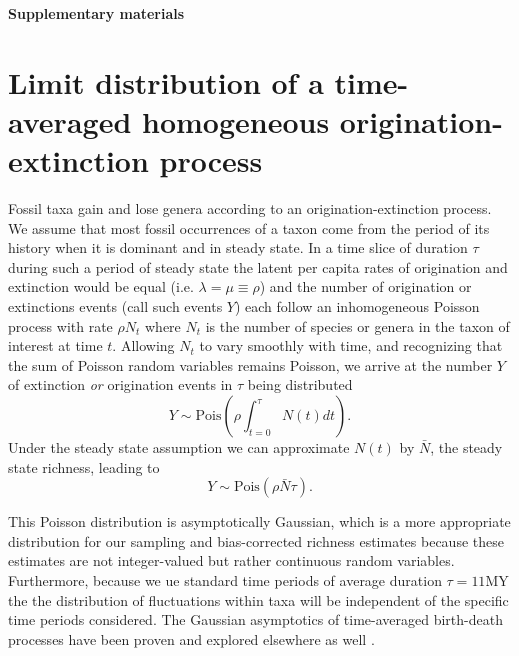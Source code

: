 \documentclass[12pt]{article}
\let\citep=\cite
\begin{document}
\clearpage

\newcommand{\beginsupplement}{%
  \setcounter{table}{0}
  \renewcommand{\thetable}{S\arabic{table}}%
  \setcounter{figure}{0}
  \renewcommand{\thefigure}{S\arabic{figure}}%
  \setcounter{section}{0}
  \renewcommand{\thesection}{S\arabic{section}}%
}

\beginsupplement

\begin{center}
{\LARGE \bf Supplementary materials}
\end{center}
\vspace{2em}

\section{Limit distribution of a time-averaged homogeneous
  origination-extinction process}
\label{sec:suppLimitDist}

Fossil taxa gain and lose genera according to an origination-extinction
process. We assume that most fossil occurrences of a taxon come from
the period of its history when it is dominant and in steady state. In
a time slice of duration $\tau$ during such a period of steady state
the latent per capita rates of origination and extinction would be
equal (i.e. $\lambda = \mu \equiv \rho$) and the number of origination
or extinctions events (call such events $Y$) each follow an
inhomogeneous Poisson process with rate $\rho N_t$ where $N_t$ is the
number of species or genera in the taxon of interest at time
$t$. Allowing $N_t$ to vary smoothly with time, and recognizing that
the sum of Poisson random variables remains Poisson, we arrive at the
number $Y$ of extinction \emph{or} origination events in $\tau$ being
distributed
\begin{equation}
  \label{eq:eventPois1}
  Y \sim \text{Pois}(\rho \int_{t=0}^\tau N(t) dt).
\end{equation}
Under the steady state assumption we can approximate $N(t)$ by
$\bar{N}$, the steady state richness, leading to
\begin{equation}
  \label{eq:eventPois2}
  Y \sim \text{Pois}(\rho \bar{N} \tau).
\end{equation}

This Poisson distribution is asymptotically Gaussian, which is a more
appropriate distribution for our sampling and bias-corrected richness
estimates because these estimates are not integer-valued but rather
continuous random variables. Furthermore, because we ue standard time
periods of average duration $\tau = 11\text{MY}$ the the distribution
of fluctuations within taxa will be independent of the specific time
periods considered. The Gaussian asymptotics of time-averaged
birth-death processes have been proven and explored elsewhere as well
\citep{keilson1970, grassmann1987}.
\end{document}
